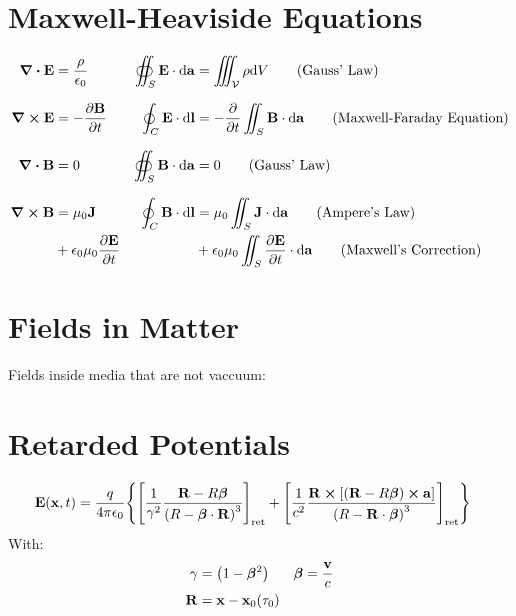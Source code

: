 \section{Maxwell-Heaviside Equations}
\begin{align*}
	\div\vb{E}&=\frac{\rho}{\epsilon_0}
	&
	\oiint_{S}\vb{E}\da&=\iiint_{\mathcal{V}}\rho\d V\tag{Gauss' Law}
	\\[0.25cm]
	\curl\vb{E}&=-\pdv{\vb{B}}{t}
	&
	\oint_{C}\vb{E}\dl&=-\pdv{t}\iint_{S}\vb{B}\da\tag{Maxwell-Faraday Equation}
	\\[0.25cm]
	\div\vb{B}&=0
	&
	\oiint_{S}\vb{B}\da&=0\tag{Gauss' Law}
	\\[0.25cm]
	\curl\vb{B}&=\mu_0\vb{J}
	&
	\oint_{C}\vb{B}\dl&=\mu_0\iint_{S}\vb{J}\da\tag{Ampere's Law}
	\\
	&+\epsilon_0\mu_0\pdv{\vb{E}}{t}&&+\epsilon_0\mu_0\iint_{S}\pdv{\vb{E}}{t}\da\tag{Maxwell's Correction}
\end{align*}
\section{Fields in Matter}
Fields inside media that are not vaccuum:
\section{Retarded Potentials}
\begin{align*}
	\vb{E}(\vb{x},t)&=\frac{q}{4\pi\epsilon_0}\qty{\qty[\oo{\gamma^2}\frac{\vb{R}-R\vb*{\beta}}{\qty(R-\vb*{\beta}\cdot\vb{R})^3}]_\text{ret}
	+\qty[\oo{c^2}\frac{\vb{R}\cross\qty[\qty(\vb{R}-R\vb*{\beta})\cross\vb{a}]}{\qty(R-\vb{R}\cdot\vb*{\beta})^3}]_\text{ret}}
\end{align*}
With:
\begin{align*}
	\gamma&=\qty(1-\vb*{\beta}^2)
	&
	\vb*{\beta}&=\frac{\vb{v}}{c}
	\\
	\vb{R}&=\vb{x}-\vb{x}_0(\tau_0)
\end{align*}
